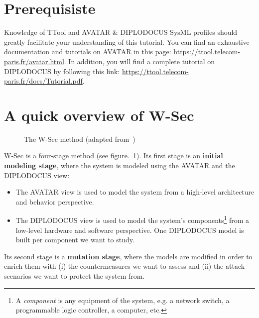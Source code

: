 \documentclass{article}
\begin{document}
\section{Prerequisiste}

Knowledge of TTool and AVATAR \& DIPLODOCUS SysML profiles should greatly facilitate your understanding of this tutorial. You can find an exhaustive documentation and tutorials on AVATAR in this page: \url{https://ttool.telecom-paris.fr/avatar.html}. In addition, you will find a complete tutorial on DIPLODOCUS by following this link: \url{https://ttool.telecom-paris.fr/docs/Tutorial.pdf}.



\section{A quick overview of W-Sec}

\begin{figure}[t]
	\hspace*{-2cm}
	\centering
	
	\caption{The W-Sec method (adapted from~\cite{wsec})}
	\label{fig:method}
\end{figure}

W-Sec is a four-stage method (see figure.~\ref{fig:method}). Its first stage is an \textbf{initial modeling stage}, where the system is modeled using the AVATAR and the DIPLODOCUS view:
\begin{itemize}
	\item The AVATAR view is used to model the system from a high-level architecture and behavior perspective.
	\item The DIPLODOCUS view is used to model the system's components\footnote{A \emph{component} is any equipment of the system, e.g. a network switch, a programmable logic controller, a computer, etc.} from a low-level hardware and software perspective. One DIPLODOCUS model is built per component we want to study.
\end{itemize}

Its second stage is a \textbf{mutation stage}, where the models are modified in order to enrich them with (i) the countermeasures we want to assess and (ii) the attack scenarios we want to protect the system from.
\end{document}
